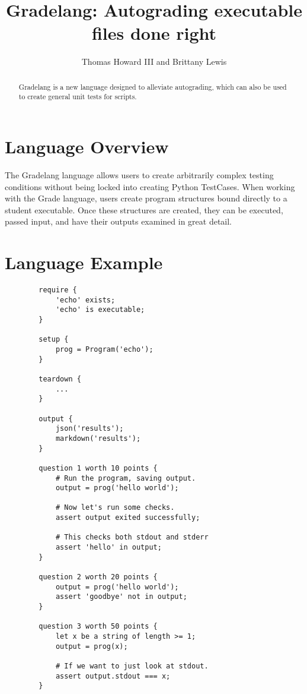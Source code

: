 \documentclass{article}
\title{Gradelang: Autograding executable files done right}
\author{Thomas Howard III and Brittany Lewis}
\begin{document}
    \maketitle

    \begin{abstract}
        Gradelang is a new language designed to alleviate autograding, which can also be used to create general unit tests for scripts.
    \end{abstract}
    
    \section{Language Overview}
    The Gradelang language allows users to create arbitrarily complex testing conditions without being locked into creating Python TestCases.
    When working with the Grade language, users create program structures bound directly to a student executable.
    Once these structures are created, they can be executed, passed input, and have their outputs examined in great detail.
    
      
    \newpage
    \section{Language Example}
    \begin{lstlisting}
        require {
            'echo' exists;
            'echo' is executable;
        }

        setup {
            prog = Program('echo');
        }

        teardown {
            ...
        }

        output {
            json('results');
            markdown('results');
        }

        question 1 worth 10 points {
            # Run the program, saving output.
            output = prog('hello world');

            # Now let's run some checks.
            assert output exited successfully;
            
            # This checks both stdout and stderr
            assert 'hello' in output;
        }

        question 2 worth 20 points {
            output = prog('hello world');
            assert 'goodbye' not in output;
        }

        question 3 worth 50 points {
            let x be a string of length >= 1;
            output = prog(x);

            # If we want to just look at stdout.
            assert output.stdout === x;
        }
    \end{lstlisting}
\end{document}
